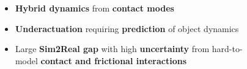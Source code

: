 \documentclass[aspectratio=169]{beamer}
\begin{document}
\begin{frame}[t]
  \begin{columns}[T]
    \begin{column}{0.55\textwidth}
      \centering
      \begin{figure}
      \end{figure}
    \end{column}
    \begin{column}{0.45\textwidth}
      \vspace*{5mm}
      \begin{itemize}
        \item<only@3-> \textbf{\textcolor{infoRed}{Hybrid dynamics}} from \textbf{contact modes}
        \item<only@4-> \textbf{\textcolor{infoRed}{Underactuation}} requiring \textbf{prediction} of object dynamics
        \item<only@5-> Large \textbf{\textcolor{infoRed}{Sim2Real gap}} with high \textbf{uncertainty} from hard-to-model \textbf{contact and frictional interactions}
      \end{itemize}
    \end{column}
  \end{columns}
\end{frame}
\end{document}
